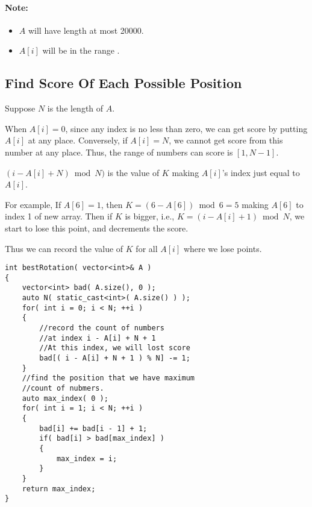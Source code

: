 \paragraph{Note:}

\begin{itemize}
\item $A$ will have length at most 20000.
\item $A[i]$ will be in the range \fcj{[0, A.length]}.
\end{itemize}

\subsection{Find Score Of Each Possible Position}
Suppose $N$ is the length of $A$. 

When $A[i]=0$, since any index is no less than zero, we can get score by putting $A[i]$ at any place. Conversely, if $A[i]=N$, we cannot get score from this number at any place. Thus, the range of numbers can score is $[1, N-1]$.

$(i-A[i]+N)\bmod N)$ is the value of $ K $ making $ A[i] $'s index just equal to $ A[i] $.

For example, If $ A[6] = 1 $, then $ K = (6 - A[6]) \bmod 6 = 5 $ making $ A[6] $ to index 1 of new array. Then if $K$ is bigger, i.e., $ K = (i - A[i] + 1) \bmod N $, we start to lose this point, and decrements the score.


Thus we can record the value of $K$ for all $ A[i] $ where we lose points.

\setcounter{lstlisting}{0}
\begin{lstlisting}[style=customc, caption={One Pass}]
int bestRotation( vector<int>& A )
{
    vector<int> bad( A.size(), 0 );
    auto N( static_cast<int>( A.size() ) );
    for( int i = 0; i < N; ++i )
    {
        //record the count of numbers
        //at index i - A[i] + N + 1
        //At this index, we will lost score
        bad[( i - A[i] + N + 1 ) % N] -= 1;
    }
	//find the position that we have maximum
	//count of nubmers.
    auto max_index( 0 );
    for( int i = 1; i < N; ++i )
    {
        bad[i] += bad[i - 1] + 1;
        if( bad[i] > bad[max_index] )
        {
            max_index = i;
        }
    }
    return max_index;
}
\end{lstlisting}